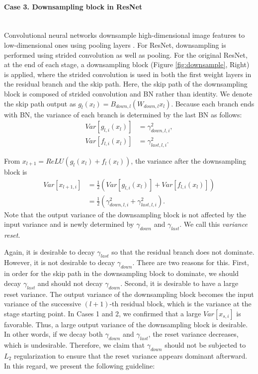 \documentclass{article}
\begin{document}
\paragraph{Case 3. Downsampling block in ResNet} \ \\
Convolutional neural networks downsample high-dimensional image features to low-dimensional ones using pooling layers \cite{DBLP:conf/nips/KrizhevskySH12}. For ResNet, downsampling is performed using strided convolution \cite{DBLP:journals/corr/SpringenbergDBR14} as well as pooling. For the original ResNet, at the end of each stage, a downsampling block (Figure \ref{fig:downsample}, Right) is applied, where the strided convolution is used in both the first weight layers in the residual branch and the skip path. Here, the skip path of the downsampling block is composed of strided convolution and BN rather than identity. We denote the skip path output as $g_l(x_l)=B_{down,l}(W_{down,l}x_l)$. Because each branch ends with BN, the variance of each branch is determined by the last BN as follows:
\begin{align}
	Var[g_{l,i}(x_l)] & = \gamma_{down,l,i}^2, \\
	Var[f_{l,i}(x_l)] & = \gamma_{last,l,i}^2.
\end{align}

From $x_{l+1} = ReLU(g_l(x_l) + f_l(x_l))$, the variance after the downsampling block is
\begin{align}
	Var[x_{l+1,i}] & = \frac{1}{2} (Var[g_{l,i}(x_l)] + Var[f_{l,i}(x_l)])      \\
	               & = \frac{1}{2} (\gamma_{down,l,i}^2 + \gamma_{last,l,i}^2).
\end{align}
Note that the output variance of the downsampling block is not affected by the input variance and is newly determined by $\gamma_{down}$ and $\gamma_{last}$. We call this \emph{variance reset}.

Again, it is desirable to decay $\gamma_{last}$ so that the residual branch does not dominate. However, it is not desirable to decay $\gamma_{down}$. There are two reasons for this. First, in order for the skip path in the downsampling block to dominate, we should decay $\gamma_{last}$ and should not decay $\gamma_{down}$. Second, it is desirable to have a large reset variance. The output variance of the downsampling block becomes the input variance of the successive $(l+1)$-th residual block, which is the variance at the stage starting point. In Cases 1 and 2, we confirmed that a large $Var[x_{s,i}]$ is favorable. Thus, a large output variance of the downsampling block is desirable. In other words, if we decay both $\gamma_{down}$ and $\gamma_{last}$, the reset variance decreases, which is undesirable. Therefore, we claim that $\gamma_{down}$ should not be subjected to $L_2$ regularization to ensure that the reset variance appears dominant afterward. In this regard, we present the following guideline:
\end{document}

